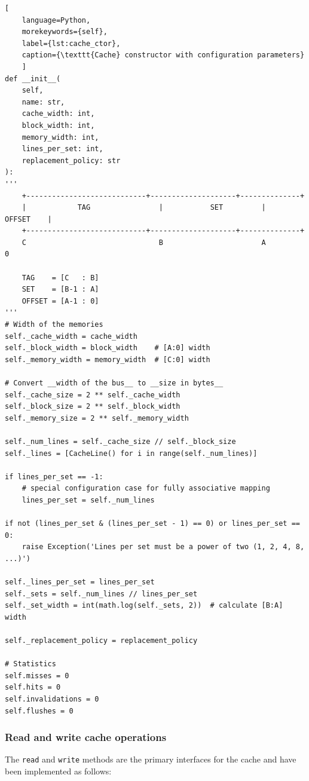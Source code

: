 \begin{center}
\centering
\begin{minipage}{\linewidth}
\begin{lstlisting}[
    language=Python,
	morekeywords={self},
    label={lst:cache_ctor},
    caption={\texttt{Cache} constructor with configuration parameters}
    ]
def __init__(
	self,
	name: str,
	cache_width: int,
	block_width: int,
	memory_width: int,
	lines_per_set: int,
	replacement_policy: str
):
'''
    +----------------------------+--------------------+--------------+
    |            TAG                |           SET         |     OFFSET    |
    +----------------------------+--------------------+--------------+
    C                               B                       A               0

    TAG    = [C   : B]
    SET    = [B-1 : A]
    OFFSET = [A-1 : 0]
'''
# Width of the memories
self._cache_width = cache_width
self._block_width = block_width    # [A:0] width
self._memory_width = memory_width  # [C:0] width

# Convert __width of the bus__ to __size in bytes__
self._cache_size = 2 ** self._cache_width
self._block_size = 2 ** self._block_width
self._memory_size = 2 ** self._memory_width

self._num_lines = self._cache_size // self._block_size
self._lines = [CacheLine() for i in range(self._num_lines)]

if lines_per_set == -1:
    # special configuration case for fully associative mapping
    lines_per_set = self._num_lines

if not (lines_per_set & (lines_per_set - 1) == 0) or lines_per_set == 0:
    raise Exception('Lines per set must be a power of two (1, 2, 4, 8, ...)')

self._lines_per_set = lines_per_set
self._sets = self._num_lines // lines_per_set
self._set_width = int(math.log(self._sets, 2))  # calculate [B:A] width

self._replacement_policy = replacement_policy

# Statistics
self.misses = 0
self.hits = 0
self.invalidations = 0
self.flushes = 0
\end{lstlisting}
\end{minipage}
\end{center}

\subsubsection*{Read and write cache operations}
\noindent The \texttt{read} and \texttt{write} methods are the primary interfaces for the cache and have been implemented as follows:

